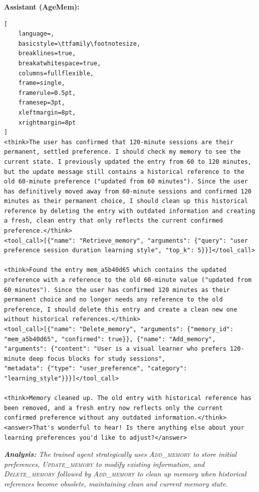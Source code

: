 \vspace{0.2cm}
\noindent\textbf{Assistant (AgeMem):}
\begin{footnotesize}
\begin{lstlisting}[
    language=,
    basicstyle=\ttfamily\footnotesize,
    breaklines=true,
    breakatwhitespace=true,
    columns=fullflexible,
    frame=single,
    framerule=0.5pt,
    framesep=3pt,
    xleftmargin=8pt,
    xrightmargin=8pt
]
<think>The user has confirmed that 120-minute sessions are their permanent, settled preference. I should check my memory to see the current state. I previously updated the entry from 60 to 120 minutes, but the update message still contains a historical reference to the old 60-minute preference ("updated from 60 minutes"). Since the user has definitively moved away from 60-minute sessions and confirmed 120 minutes as their permanent choice, I should clean up this historical reference by deleting the entry with outdated information and creating a fresh, clean entry that only reflects the current confirmed preference.</think>
<tool_call>[{"name": "Retrieve_memory", "arguments": {"query": "user preference session duration learning style", "top_k": 5}}]</tool_call>

<think>Found the entry mem_a5b40d65 which contains the updated preference with a reference to the old 60-minute value ("updated from 60 minutes"). Since the user has confirmed 120 minutes as their permanent choice and no longer needs any reference to the old preference, I should delete this entry and create a clean new one without historical references.</think>
<tool_call>[{"name": "Delete_memory", "arguments": {"memory_id": 
"mem_a5b40d65", "confirmed": true}}, {"name": "Add_memory", "arguments": {"content": "User is a visual learner who prefers 120-minute deep focus blocks for study sessions", 
"metadata": {"type": "user_preference", "category": "learning_style"}}}]</tool_call>

<think>Memory cleaned up. The old entry with historical reference has been removed, and a fresh entry now reflects only the current confirmed preference without any outdated information.</think>
<answer>That's wonderful to hear! Is there anything else about your learning preferences you'd like to adjust?</answer>
\end{lstlisting}
\end{footnotesize}

\vspace{0.25cm}
\noindent\textit{\textbf{Analysis:} The trained agent strategically uses \textsc{Add\_memory} to store initial preferences, \textsc{Update\_memory} to modify existing information, and \textsc{Delete\_memory} followed by \textsc{Add\_memory} to clean up memory when historical references become obsolete, maintaining clean and current memory state.}

